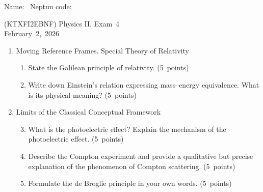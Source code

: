 \documentclass[a4paper,12pt]{letter}
\begin{document}
Name: \hrulefill\ Neptun code: \hrulefill

\bigskip

\begin{center}
(KTXFI2EBNF) Physics II. Exam~4 \\
February~2,~2026
\end{center}

\bigskip
 
\begin{enumerate}[label=\Roman*.]
   
\item Moving Reference Frames. Special Theory of Relativity

\begin{enumerate}[label=\arabic*.]
\setcounter{enumii}{0} %

\item State the Galilean principle of relativity. \hfill (5~points)

  
\item Write down Einstein’s relation expressing mass–energy equivalence. What is its physical meaning? \hfill (5~points)

\end{enumerate}


\item Limits of the Classical Conceptual Framework

\begin{enumerate}[label=\arabic*.]
\setcounter{enumii}{2} %

\item What is the photoelectric effect? Explain the mechanism of the photoelectric effect. \hfill (5~points)
  
\item Describe the Compton experiment and provide a qualitative but precise explanation of the phenomenon of Compton scattering. \hfill (5~points)
\item Formulate the de Broglie principle in your own words. \hfill (5~points)


\end{enumerate}
\end{enumerate}
\end{document}

